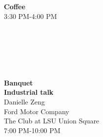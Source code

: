 \begin{calendar}{\textwidth}
{\textbf{Coffee} \\3:30 PM-4:00 PM \\\daysep
{}~ \\\vspace{0.1cm}  \\\vspace{0.6cm} \textcolor{white}{M} \\ \textcolor{white}{M}  \\\daysep
{}~ \\\vspace{0.1cm}  \\\daysep
\textbf{Banquet} \\
\textbf{Industrial talk} \\ Danielle Zeng \\Ford Motor Company \\\vspace{0.1cm} The Club at LSU Union Square \\\vspace{0.1cm} 7:00 PM-10:00 PM\\\daysep
}




\end{calendar}
